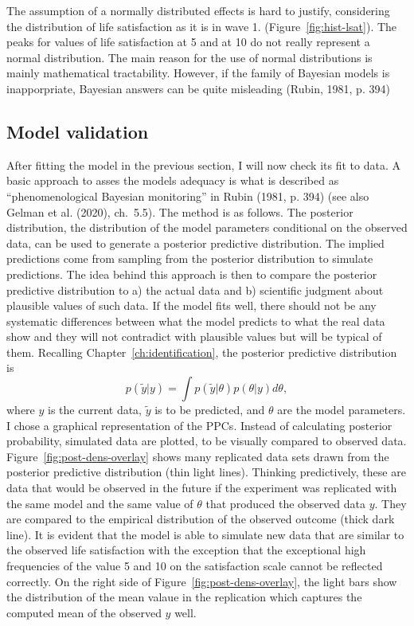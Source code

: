 \documentclass[a4, 12pt]{article}
\begin{document}
The assumption of a normally distributed effects is hard to justify, considering the distribution of life satisfaction as it is in wave 1. (Figure~\ref{fig:hist-lsat}). The peaks for values of life satisfaction at 5 and at 10 do not really represent a normal distribution. The main reason for the use of normal distributions is mainly mathematical tractability. However, if the family of Bayesian models is inapporpriate, Bayesian answers can be quite misleading (Rubin, 1981, p. 394)

\hypertarget{model-validation}{%
\subsection{Model validation}\label{model-validation}}

\label{sec:validation}
After fitting the model in the previous section, I will now check its fit to data. A basic approach to asses the models adequacy is what is described as ``phenomenological Bayesian monitoring'' in Rubin (1981, p. 394) (see also Gelman et al. (2020), ch.~5.5). The method is as follows. The posterior distribution, the distribution of the model parameters conditional on the observed data, can be used to generate a posterior predictive distribution. The implied predictions come from sampling from the posterior distribution to simulate predictions. The idea behind this approach is then to compare the posterior predictive distribution to a) the actual data and b) scientific judgment about plausible values of such data. If the model fits well, there should not be any systematic differences between what the model predicts to what the real data show and they will not contradict with plausible values but will be typical of them. Recalling Chapter~\ref{ch:identification}, the posterior predictive distribution is
\[p(\tilde{y}|y) =\int p(\tilde{y}|\theta)p(\theta|y)d\theta,\]
where \(y\) is the current data, \(\tilde y\) is to be predicted, and \(\theta\) are the model parameters.
I chose a graphical representation of the PPCs. Instead of calculating posterior probability, simulated data are plotted, to be visually compared to observed data.
Figure~\ref{fig:post-dens-overlay} shows many replicated data sets drawn from the posterior predictive distribution (thin light lines). Thinking predictively, these are data that would be observed in the future if the experiment was replicated with the same model and the same value of \(\theta\) that produced the observed data \(y\). They are compared to the empirical distribution of the observed outcome (thick dark line). It is evident that the model is able to simulate new data that are similar to the observed life satisfaction with the exception that the exceptional high frequencies of the value 5 and 10 on the satisfaction scale cannot be reflected correctly.
On the right side of Figure~\ref{fig:post-dens-overlay}, the light bars show the distribution of the mean valaue in the replication which captures the computed mean of the observed \(y\) well.
\end{document}
